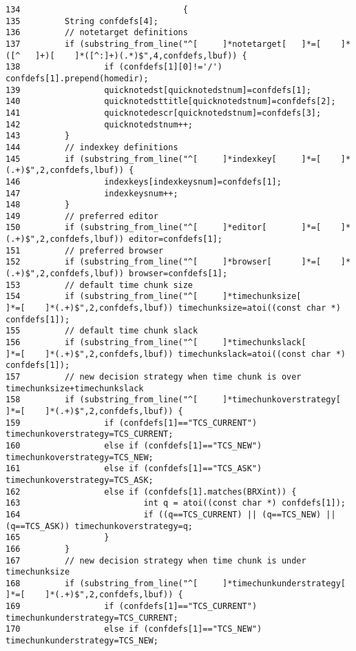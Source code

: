 \footnotesize\begin{verbatim}134                                 {
135         String confdefs[4];
136         // notetarget definitions
137         if (substring_from_line("^[     ]*notetarget[   ]*=[    ]*([^   ]+)[    ]*([^:]+)(.*)$",4,confdefs,lbuf)) {
138                 if (confdefs[1][0]!='/') confdefs[1].prepend(homedir);
139                 quicknotedst[quicknotedstnum]=confdefs[1];
140                 quicknotedsttitle[quicknotedstnum]=confdefs[2];
141                 quicknotedescr[quicknotedstnum]=confdefs[3];
142                 quicknotedstnum++;
143         }
144         // indexkey definitions
145         if (substring_from_line("^[     ]*indexkey[     ]*=[    ]*(.+)$",2,confdefs,lbuf)) {
146                 indexkeys[indexkeysnum]=confdefs[1];
147                 indexkeysnum++;
148         }
149         // preferred editor
150         if (substring_from_line("^[     ]*editor[       ]*=[    ]*(.+)$",2,confdefs,lbuf)) editor=confdefs[1];
151         // preferred browser
152         if (substring_from_line("^[     ]*browser[      ]*=[    ]*(.+)$",2,confdefs,lbuf)) browser=confdefs[1];
153         // default time chunk size
154         if (substring_from_line("^[     ]*timechunksize[        ]*=[    ]*(.+)$",2,confdefs,lbuf)) timechunksize=atoi((const char *) confdefs[1]);
155         // default time chunk slack
156         if (substring_from_line("^[     ]*timechunkslack[       ]*=[    ]*(.+)$",2,confdefs,lbuf)) timechunkslack=atoi((const char *) confdefs[1]);
157         // new decision strategy when time chunk is over timechunksize+timechunkslack
158         if (substring_from_line("^[     ]*timechunkoverstrategy[        ]*=[    ]*(.+)$",2,confdefs,lbuf)) {
159                 if (confdefs[1]=="TCS_CURRENT") timechunkoverstrategy=TCS_CURRENT;
160                 else if (confdefs[1]=="TCS_NEW") timechunkoverstrategy=TCS_NEW;
161                 else if (confdefs[1]=="TCS_ASK") timechunkoverstrategy=TCS_ASK;
162                 else if (confdefs[1].matches(BRXint)) {
163                         int q = atoi((const char *) confdefs[1]);
164                         if ((q==TCS_CURRENT) || (q==TCS_NEW) || (q==TCS_ASK)) timechunkoverstrategy=q;
165                 }
166         }
167         // new decision strategy when time chunk is under timechunksize
168         if (substring_from_line("^[     ]*timechunkunderstrategy[       ]*=[    ]*(.+)$",2,confdefs,lbuf)) {
169                 if (confdefs[1]=="TCS_CURRENT") timechunkunderstrategy=TCS_CURRENT;
170                 else if (confdefs[1]=="TCS_NEW") timechunkunderstrategy=TCS_NEW;

\end{verbatim}
